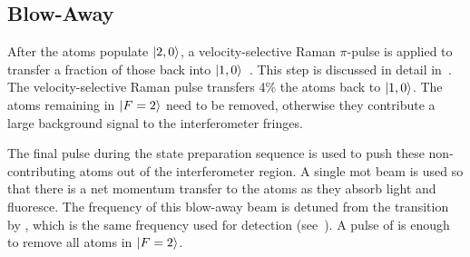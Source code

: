 \subsection{Blow-Away}\label{subsec:blow_away}
After the atoms populate \(\ket{2,0}\), a velocity-selective Raman
\(\pi\)-pulse is applied to transfer a fraction of those back into
\(\ket{1,0}\)~\cite{Kasevich1991a}. This step is discussed in detail
in~. The velocity-selective Raman pulse
transfers 4\% the atoms
back to \(\ket{1,0}\). The atoms remaining in $\ket{F=2}$ need to be removed, otherwise
they contribute a large background signal to the interferometer
fringes. \par\noindent
The final pulse during the state preparation sequence is used to push
these non-contributing atoms out of the interferometer region. A
single \ac{mot} beam is used so that there is a net momentum transfer
to the atoms as they absorb light and fluoresce. The frequency of this
blow-away beam is detuned from the  transition by
, which is the same frequency used for
detection (see~). A pulse of
 is enough to remove all atoms in
\(\ket{F=2}\). 



